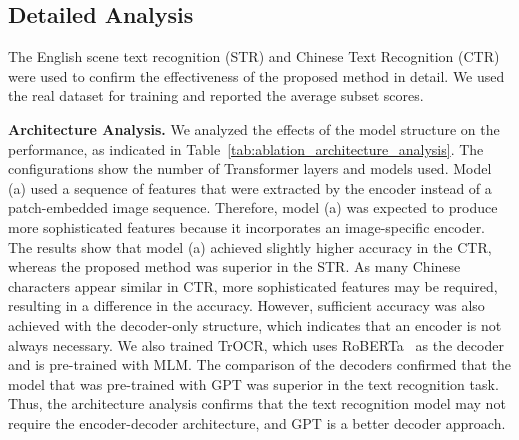 \documentclass[10pt,twocolumn,letterpaper]{article}
\begin{document}
\begin{table}[bt]
\centering
\caption{
 	Effects of pre-trained decoder architecture.
}
\label{tab:ablation_pretrained_decoder}
\end{table}




\subsection{Detailed Analysis}
The English scene text recognition (STR) and Chinese Text Recognition (CTR) were used to confirm the effectiveness of the proposed method in detail.
We used the real dataset for training and reported the average subset scores.

\noindent
\textbf{Architecture Analysis.}
We analyzed the effects of the model structure on the performance, as indicated in
Table~\ref{tab:ablation_architecture_analysis}.
The configurations show the number of Transformer layers and models used.
Model (a) used a sequence of features that were extracted by the encoder instead of a patch-embedded image sequence.
Therefore, model (a) was expected to produce more sophisticated features because it incorporates an image-specific encoder.
The results show that model (a) achieved slightly higher accuracy in the CTR, whereas the proposed method was superior in the STR.
As many Chinese characters appear similar in CTR, more sophisticated features may be required, resulting in a difference in the accuracy.
However, sufficient accuracy was also achieved with the decoder-only structure, which indicates that an encoder is not always necessary.
We also trained TrOCR, which uses RoBERTa~\cite{liu2019roberta} as the decoder and is pre-trained with MLM.
The comparison of the decoders confirmed that the model that was pre-trained with GPT was superior in the text recognition task.
Thus, the architecture analysis confirms that the text recognition model may not require the encoder-decoder architecture, and GPT is a better decoder approach.
\end{document}
